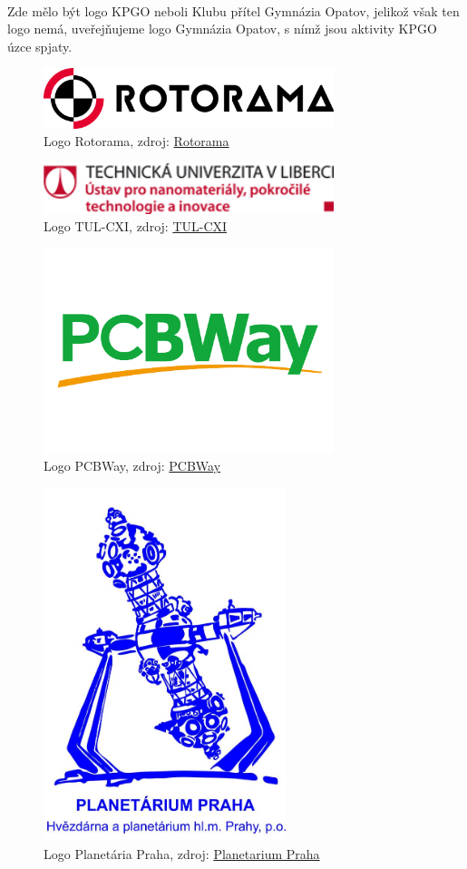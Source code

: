 \documentclass[a4paper]{report}
\begin{document}
\paragraph{} Zde mělo být logo KPGO neboli Klubu přítel Gymnázia Opatov, jelikož však ten logo nemá, uveřejňujeme logo Gymnázia Opatov, s nímž jsou aktivity KPGO úzce spjaty.
\begin{figure}[H]
\centering
\caption{Logo Rotorama, zdroj: 
\href{https://www.rotorama.cz}{Rotorama}}
\includegraphics[width=240pt]{rotorama.png}
\end{figure}
\begin{figure}[H]
\centering
\caption{Logo TUL-CXI, zdroj: 
\href{http://cxi.tul.cz}{TUL-CXI}}
\includegraphics[width=240pt]{tul.png}
\end{figure}
\begin{figure}[H]
\centering
\caption{Logo PCBWay, zdroj: 
\href{http://pcbway.com}{PCBWay}}
\includegraphics[width=240pt]{pcbway.png}
\end{figure}
\begin{figure}[H]
\centering
\caption{Logo Planetária Praha, zdroj: 
\href{http://www.planetarium.cz}{Planetarium Praha}}
\includegraphics[width=200pt]{planet.png}
\end{figure}
\end{document}
